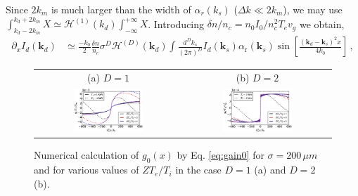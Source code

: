 \documentclass[
 reprint,
 amsmath,amssymb,
 aps,
]{revtex4-1}
\begin{document}
\begin{widetext}
Since $2k_m$ is much larger than the width of $\alpha_r(k_s)$ ($\Delta k\ll 2k_m$), we may use $\int_{k_d-2k_m}^{k_d+2k_m} X \simeq \mathcal{H}^{(1)}(k_d) \int_{-\infty}^{+\infty}X$. Introducing $\delta n/n_c=n_0I_0/{n_c^2 T_ev_g}$ we obtain, 
 \begin{align}
\partial_xI_d(\mathbf{k}_d)&\simeq  \frac{-k_0}{2} \frac{ \delta n}{n_c}   \sigma^D
 \mathcal{H}^{(D)}(\mathbf{k}_d)
 \int \frac{d^Dk_s}{(2\pi)^D}    I_d(\mathbf{k}_s) \alpha_\mathrm{r}(\mathbf{k}_s)  \sin\left[{\frac{ (\mathbf{k}_d-\mathbf{k}_s)^2x}{4k_0}}  \right]
\, ,  \label{eq:g5}
\end{align}
 
 \begin{figure}[!]
\begin{tabular}{cc}
(a) $D=1$ &(b) $D=2$ \\
\includegraphics[width=0.49\textwidth]{int_akin_sin.eps}
 &
\includegraphics[width=0.49\textwidth]{int_akin_sin_D2.eps}
\end{tabular}
\caption{ \label{fig:intakinsin}
Numerical calculation of $g_0(x)$ by Eq. \eqref{eq:gain0} for $\sigma = 200 \,\mu m$ and  for various values of $ZT_e/T_i$ in the case $D=1$ (a) and $D=2$ (b). 
 }
\end{figure}


\end{widetext}
\end{document}
